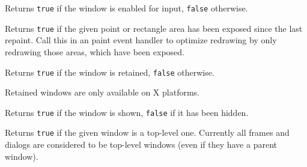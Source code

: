 Returns {\tt true} if the window is enabled for input, {\tt false} otherwise.



\label{wxwindowisexposed}





Returns {\tt true} if the given point or rectangle area has been exposed since the
last repaint. Call this in an paint event handler to optimize redrawing by
only redrawing those areas, which have been exposed.


\label{wxwindowisretained}


Returns {\tt true} if the window is retained, {\tt false} otherwise.


Retained windows are only available on X platforms.

\label{wxwindowisshown}


Returns {\tt true} if the window is shown, {\tt false} if it has been hidden.

\label{wxwindowistoplevel}


Returns {\tt true} if the given window is a top-level one. Currently all frames and
dialogs are considered to be top-level windows (even if they have a parent
window).

